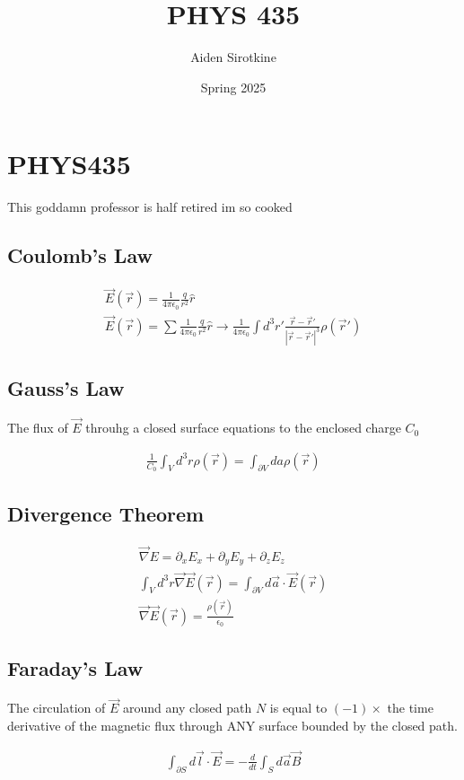 \documentclass[fleqn]{report}
\date{Spring 2025}
\title{PHYS 435}
\author{Aiden Sirotkine}
\newcommand{\del}{\partial}
\newcommand{\equations} [1] {
\begin{gather*}
#1
\end{gather*}
}
\begin{document}
\pagestyle{fancy}
\maketitle
\tableofcontents
\clearpage

\chapter{PHYS435}
This goddamn professor is half retired im so cooked 

\section{Coulomb's Law}
\equations{
    \vec E(\vec r) = \frac{1}{4 \pi \epsilon_0} \frac{q}{r^2} \hat r 
    \\
    \vec E(\vec r) = \sum \frac{1}{4 \pi \epsilon_0} \frac{q}{r^2} \hat r 
    \rightarrow 
    \frac{1}{4 \pi \epsilon_0} 
    \int 
    d^3 r' 
    \frac{\vec r - \vec r'}{|\vec r - \vec r'|^3} \rho(\vec r')
}

\section{Gauss's Law}
The flux of $\vec E$ throuhg a closed surface equations to the enclosed charge $C_0$

\equations{
    \frac{1}{C_0} \int_V d^3 r \rho(\vec r) = \int_{\del V} d a \rho(\vec r)
}

\section{Divergence Theorem}
\equations{
    \vec \nabla E = \del_x E_x + \del_y E_y + \del_z E_z
    \\
    \int_V d^3 r \vec \nabla \vec E(\vec r) = \int_{\del V} d \vec a \cdot \vec E(\vec r)
    \\
    \vec \nabla \vec E(\vec r) = \frac{\rho(\vec r)}{\epsilon_0}
}

\section{Faraday's Law}
The circulation of $\vec E$ around any closed path $N$ is equal to $(-1) \times$ 
the time derivative of the magnetic flux  through ANY surface bounded by 
the closed path.

\equations{
    \int_{\del S} d \vec l \cdot \vec E = - \frac{d}{dt} \int_S d \vec a \vec B 
}
\end{document}
